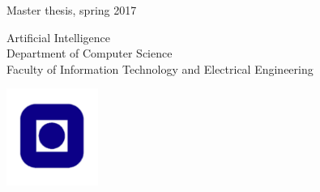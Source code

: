 \begin{titlepage}
\vspace{2cm}

\vspace{2cm}

\noindent Master thesis, spring 2017
\vspace{2cm}

\noindent Artificial Intelligence \\Department of Computer Science
\\Faculty of Information Technology and Electrical Engineering \\

\vfill
\begin{center}
\includegraphics[width=3cm]{fig/pre/ntnu.pdf}
\end{center}
\end{titlepage}

\thispagestyle{empty}

\afterpage{\blankpage}